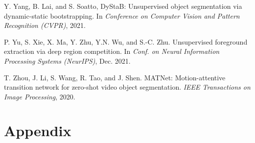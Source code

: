 \documentclass[10pt,twocolumn,letterpaper]{article}
\begin{document}
\begin{thebibliography}{28}
Y. Yang, B. Lai, and S. Soatto, 
\newblock DyStaB: Unsupervised object segmentation via dynamic-static bootstrapping.
\newblock In \emph{Conference on Computer Vision and Pattern Recognition (CVPR)}, 2021.

P. Yu, S. Xie, X. Ma, Y. Zhu, Y.N. Wu, and S.-C. Zhu.
\newblock Unsupervised foreground extraction via deep region competition.
\newblock In \emph{Conf. on Neural Information Processing Systems (NeurIPS)}, Dec. 2021.

T. Zhou, J. Li, S. Wang, R. Tao, and J. Shen.
\newblock MATNet: Motion-attentive transition network for zero-shot video object segmentation.
\newblock \emph{IEEE Transactions on Image Processing}, 2020.


\end{thebibliography}


\onecolumn

\part*{Appendix}
\setcounter{section}{0}
\end{document}
